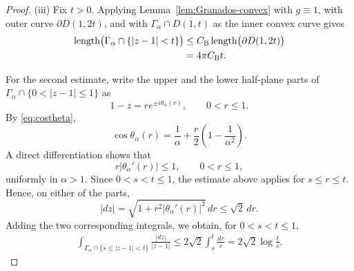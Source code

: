 \documentclass[11pt]{amsart}
\numberwithin{equation}{section}
\theoremstyle{definition}
\theoremstyle{plain}
\begin{document}
\begin{proof}
(iii)
Fix \(t>0\). Applying
Lemma~\ref{lem:Granados-convex} with \(g\equiv 1\), with outer curve
\(\partial D(1,2t)\), and 
with
\(\Gamma_\alpha\cap\overline{D(1,t)}\) as the inner convex curve
 gives
\[
\begin{aligned}
    \operatorname{length}\bigl(
        \Gamma_\alpha\cap\{|z-1|<t\}
    \bigr)
    &\le
    C_{\rm B}
    \operatorname{length}\bigl(\partial D(1,2t)\bigr)
    \\
    &=4\pi C_{\rm B}t.
\end{aligned}
\]


For the second estimate, write the upper and the lower half-plane parts of
\(\Gamma_\alpha\cap\{0<|z-1|\le1\}\) as
\[
        1-z=re^{\pm i\theta_\alpha(r)},
        \qquad 0<r\le1.
\]
By \eqref{eq:costheta},
\[
        \cos\theta_\alpha(r)
        =
        \frac1\alpha
        +
        \frac r2\left(1-\frac1{\alpha^2}\right).
\]
A direct differentiation shows that
\[
        r|\theta_\alpha'(r)|\le1,
        \qquad 0<r\le1,
\]
uniformly in \(\alpha>1\). 
Since \(0<s<t\le1\), the estimate
above applies for \(s\le r\le t\).
Hence, on either of the parts,
\[
        |dz|
        =
        \sqrt{1+r^2|\theta_\alpha'(r)|^2}\,dr
        \le \sqrt2\,dr.
\]
Adding the two corresponding integrals, we obtain, for \(0<s<t\le1\),
\[
\begin{aligned}
        \int_{\Gamma_\alpha\cap\{s\le |z-1|<t\}}
             \frac{|dz|}{|z-1|}
        \le
        2\sqrt2\int_s^{t}\frac{dr}{r} 
        =
        2\sqrt2\log\frac{t}{s}.
\end{aligned}
\]




\end{proof}
\end{document}
